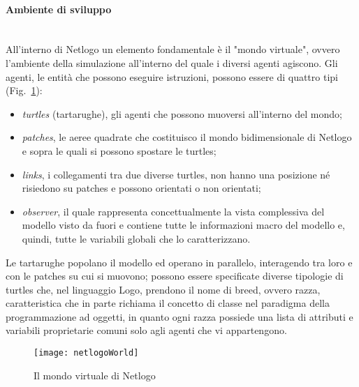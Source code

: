 \documentclass[12pt,a4paper,openright,twoside]{report}
\newcommand{\myparagraph}[1]{\paragraph{#1}\mbox{}\\}
\begin{document}
\myparagraph{Ambiente di sviluppo}

All'interno di Netlogo un elemento fondamentale è il "mondo virtuale", ovvero l'ambiente della simulazione all'interno del quale i diversi agenti agiscono. Gli agenti, le entità che possono eseguire istruzioni, possono essere di quattro tipi (Fig.~\ref{netlogoWorld}): \begin{itemize}
\item \emph{turtles} (tartarughe), gli agenti che possono muoversi all'interno del mondo;
\item \emph{patches}, le aeree quadrate che costituisco il mondo bidimensionale di Netlogo e sopra le quali si possono spostare le turtles;
\item \emph{links}, i collegamenti tra due diverse turtles, non hanno una posizione né risiedono su patches e possono orientati o non orientati;
\item \emph{observer}, il quale rappresenta concettualmente la vista complessiva del modello visto da fuori e contiene tutte le informazioni macro del modello e, quindi, tutte le variabili globali che lo caratterizzano.
\end{itemize}
Le tartarughe popolano il modello ed operano in parallelo, interagendo tra loro e con le patches su cui si muovono; possono essere specificate diverse tipologie di turtles che, nel linguaggio Logo, prendono il nome di breed, ovvero razza, caratteristica che in parte richiama il concetto di classe nel paradigma della programmazione ad oggetti, in quanto ogni razza possiede una lista di attributi e variabili proprietarie comuni solo agli agenti che vi appartengono.

\begin{figure}[H]
	\begin{center}
	\texttt{[image: netlogoWorld]}
	\end{center}
	\caption{Il mondo virtuale di Netlogo}
  	\label{netlogoWorld}
\end{figure}
\end{document}
